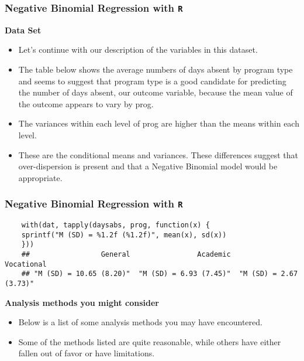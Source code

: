 \documentclass[00-GLMregslides.tex]{subfiles}
\begin{document}
\begin{frame}[fragile]
	\frametitle{Negative Binomial Regression with \texttt{R} }
	\Large
\textbf{Data Set}
\begin{itemize}
\item
	Let's continue with our description of the variables in this dataset. 
	\item The table below shows the average numbers of days absent by program type and seems to 
	suggest that program type is a good candidate for predicting the number of days absent, our outcome variable, 
	because the mean value of the outcome appears to vary by prog. 
\item The variances within each level of prog are higher than the means within each level. 
\item These are the conditional means and variances. These differences suggest that over-dispersion is present and 
that a Negative Binomial model would be appropriate.
\end{itemize}
\end{frame}
\begin{frame}[fragile]
	\frametitle{Negative Binomial Regression with \texttt{R} }
	\large
	
	\begin{verbatim}
	with(dat, tapply(daysabs, prog, function(x) {
	sprintf("M (SD) = %1.2f (%1.2f)", mean(x), sd(x))
	}))
	##                 General                Academic              Vocational 
	## "M (SD) = 10.65 (8.20)"  "M (SD) = 6.93 (7.45)"  "M (SD) = 2.67 (3.73)"
	\end{verbatim}
	\end{frame}
\begin{frame}[fragile]	

\textbf{Analysis methods you might consider}
\begin{itemize}
	\item Below is a list of some analysis methods you may have encountered. 
	\item Some of the methods listed are quite reasonable, while others have either fallen out of favor or have limitations.
	\end{itemize}
	\end{frame}
\end{document}
